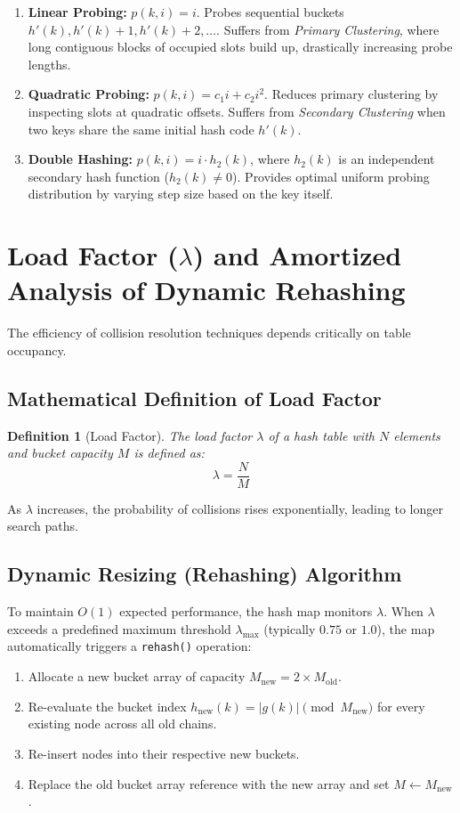 \documentclass[10pt,journal,compsoc,onecolumn]{IEEEtran}
\newtheorem{definition}[theorem]{Definition}
\begin{document}
\begin{enumerate}
    \item \textbf{Linear Probing:} $p(k, i) = i$. Probes sequential buckets $h'(k), h'(k)+1, h'(k)+2, \dots$. Suffers from \emph{Primary Clustering}, where long contiguous blocks of occupied slots build up, drastically increasing probe lengths.
    \item \textbf{Quadratic Probing:} $p(k, i) = c_1 i + c_2 i^2$. Reduces primary clustering by inspecting slots at quadratic offsets. Suffers from \emph{Secondary Clustering} when two keys share the same initial hash code $h'(k)$.
    \item \textbf{Double Hashing:} $p(k, i) = i \cdot h_2(k)$, where $h_2(k)$ is an independent secondary hash function ($h_2(k) \neq 0$). Provides optimal uniform probing distribution by varying step size based on the key itself.
\end{enumerate}

\section{Load Factor ($\lambda$) and Amortized Analysis of Dynamic Rehashing}
\label{sec:load-factor}

The efficiency of collision resolution techniques depends critically on table occupancy.

\subsection{Mathematical Definition of Load Factor}
\begin{definition}[Load Factor]
The load factor $\lambda$ of a hash table with $N$ elements and bucket capacity $M$ is defined as:
\[
\lambda = \frac{N}{M}
\]
\end{definition}

As $\lambda$ increases, the probability of collisions rises exponentially, leading to longer search paths.

\subsection{Dynamic Resizing (Rehashing) Algorithm}
To maintain $O(1)$ expected performance, the hash map monitors $\lambda$. When $\lambda$ exceeds a predefined maximum threshold $\lambda_{\max}$ (typically $0.75$ or $1.0$), the map automatically triggers a \texttt{rehash()} operation:
\begin{enumerate}
    \item Allocate a new bucket array of capacity $M_{\text{new}} = 2 \times M_{\text{old}}$.
    \item Re-evaluate the bucket index $h_{\text{new}}(k) = |g(k)| \pmod{M_{\text{new}}}$ for every existing node across all old chains.
    \item Re-insert nodes into their respective new buckets.
    \item Replace the old bucket array reference with the new array and set $M \leftarrow M_{\text{new}}$.
\end{enumerate}
\end{document}
